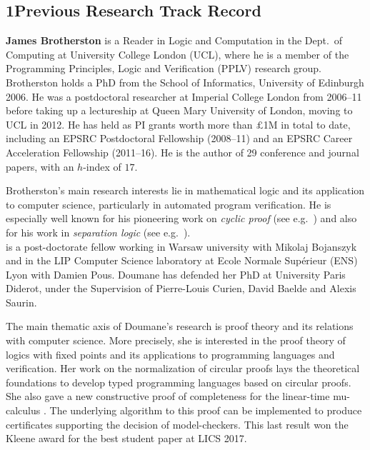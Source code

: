 \documentclass[11pt,twocolumn]{article}
\begin{document}


\begin{abstract}
  
\end{abstract}

\subsection*{1\quad Previous Research Track Record}

{\bf James Brotherston} is a Reader in Logic and Computation in the Dept.\ of Computing at University College London (UCL), where he is a member of the Programming Principles, Logic and Verification (PPLV) research group.  Brotherston holds a PhD from the School of Informatics, University of Edinburgh 2006.  He was a postdoctoral researcher at Imperial College London from 2006--11 before taking up a lectureship at Queen Mary University of London, moving to UCL in 2012. He has held as PI grants worth more than $\pounds$1M in total to date, including an EPSRC Postdoctoral Fellowship (2008--11) and an EPSRC Career Acceleration Fellowship (2011--16). He is the author of 29 conference and journal papers, with an $h$-index of $17$.

Brotherston's main research interests lie in mathematical logic and its application to computer science, particularly in automated program verification. He is especially well known for his pioneering work on \emph{cyclic proof} (see e.g.~) and also for his work in \emph{separation logic} (see e.g.~).  \\

  is a post-doctorate fellow working in Warsaw university with Mikolaj Bojanszyk and in the
LIP Computer Science laboratory at Ecole Normale
Supérieur (ENS) Lyon with Damien Pous.
Doumane has defended her PhD at University Paris Diderot,
under the Supervision of Pierre-Louis Curien, David
Baelde and Alexis Saurin.


The main thematic axis of Doumane's research is proof theory and its relations with computer science. More precisely, she is interested in the proof theory of logics with fixed points and its applications to programming languages and verification. Her work on the normalization of circular proofs \cite{baelde16csl} lays the theoretical foundations to develop typed programming languages based on circular proofs. She also gave a new constructive proof of completeness for the linear-time mu-calculus \cite{doumane16lics, doumane17lics}. The underlying  algorithm to this proof can be implemented to produce certificates supporting the decision of model-checkers. This last result won the Kleene award for the best student paper at LICS 2017. 
\end{document}
